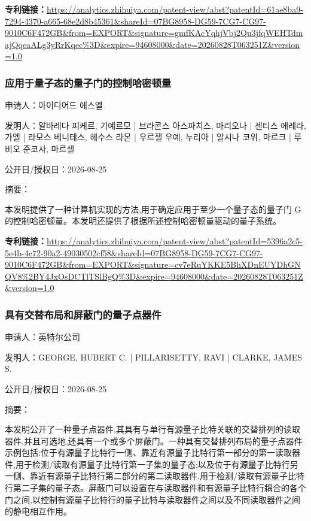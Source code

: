 \documentclass[12pt,a4paper]{ctexart}
\begin{document}
\noindent\textbf{专利链接：}\url{https://analytics.zhihuiya.com/patent-view/abst?patentId=61ae8ba9-7294-4370-a665-68e2d8b45361&shareId=07BG8958-DG59-7CG7-CG97-9010C6F472GB&from=EXPORT&signature=gmfKAcYqhjVbj2Qu3jfqWEHTdmajQqeaALg3yRrKqec%3D&expire=94608000&date=20260828T063251Z&version=1.0}

\subsubsection{ 应用于量子态的量子门的控制哈密顿量 }

申请人：아이디어드 에스엘

发明人：알바레다 피케르, 기예르모 | 브라콘스 아스파치스, 마리오나 | 센티스 에레라, 가엘 | 라모스 베니테스, 헤수스 라몬 | 우르젤 우예, 누리아 | 알시나 코위, 마르크 | 루비오 준코사, 마르셀

公开日/授权日：2026-08-25

摘要：

本发明提供了一种计算机实现的方法,用于确定应用于至少一个量子态的量子门 G 的控制哈密顿量。本发明还提供了根据所述控制哈密顿量驱动的量子系统。

\noindent\textbf{专利链接：}\url{https://analytics.zhihuiya.com/patent-view/abst?patentId=5396a2c5-5e4b-4c72-90a2-49030502cf58&shareId=07BG8958-DG59-7CG7-CG97-9010C6F472GB&from=EXPORT&signature=cv7eRuYKKE5BhXDnEUYDhGNQV8%2BY4JxOsDCTlTSlBgQ%3D&expire=94608000&date=20260828T063251Z&version=1.0}

\subsubsection{ 具有交替布局和屏蔽门的量子点器件 }

申请人：英特尔公司

发明人：GEORGE, HUBERT C. | PILLARISETTY, RAVI | CLARKE, JAMES S.

公开日/授权日：2026-08-25

摘要：

本发明公开了一种量子点器件,其具有与单行有源量子比特关联的交替排列的读取器件,并且可选地,还具有一个或多个屏蔽门。一种具有交替排列布局的量子点器件示例包括:位于有源量子比特行一侧、靠近有源量子比特行第一部分的第一读取器件,用于检测/读取有源量子比特行第一子集的量子态;以及位于有源量子比特行另一侧、靠近有源量子比特行第二部分的第二读取器件,用于检测/读取有源量子比特行第二子集的量子态。屏蔽门可以设置在与读取器件和有源量子比特行耦合的各个门之间,以控制有源量子比特行的量子比特与读取器件之间以及不同读取器件之间的静电相互作用。
\end{document}
